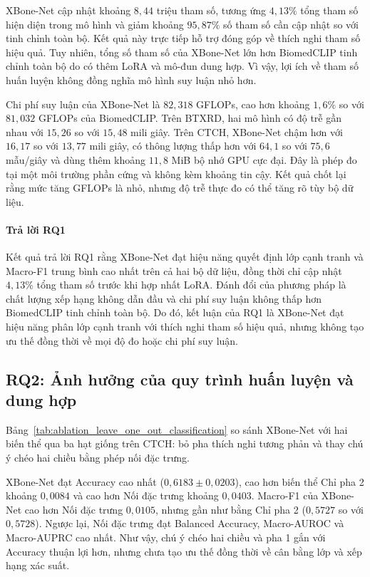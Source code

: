 

XBone-Net cập nhật khoảng $8{,}44$ triệu tham số, tương ứng $4{,}13\%$ tổng tham số hiện diện trong mô hình và giảm khoảng $95{,}87\%$ số tham số cần cập nhật so với tinh chỉnh toàn bộ. Kết quả này trực tiếp hỗ trợ đóng góp về thích nghi tham số hiệu quả. Tuy nhiên, tổng số tham số của XBone-Net lớn hơn BiomedCLIP tinh chỉnh toàn bộ do có thêm LoRA và mô-đun dung hợp. Vì vậy, lợi ích về tham số huấn luyện không đồng nghĩa mô hình suy luận nhỏ hơn.

Chi phí suy luận của XBone-Net là $82{,}318$ GFLOPs, cao hơn khoảng $1{,}6\%$ so với $81{,}032$ GFLOPs của BiomedCLIP. Trên BTXRD, hai mô hình có độ trễ gần nhau với $15{,}26$ so với $15{,}48$ mili giây. Trên CTCH, XBone-Net chậm hơn với $16{,}17$ so với $13{,}77$ mili giây, có thông lượng thấp hơn với $64{,}1$ so với $75{,}6$ mẫu/giây và dùng thêm khoảng $11{,}8$ MiB bộ nhớ GPU cực đại. Đây là phép đo tại một môi trường phần cứng và không kèm khoảng tin cậy. Kết quả chốt lại rằng mức tăng GFLOPs là nhỏ, nhưng độ trễ thực đo có thể tăng rõ tùy bộ dữ liệu.

\paragraph{Trả lời RQ1}
Kết quả trả lời RQ1 rằng XBone-Net đạt hiệu năng quyết định lớp cạnh tranh và Macro-F1 trung bình cao nhất trên cả hai bộ dữ liệu, đồng thời chỉ cập nhật $4{,}13\%$ tổng tham số trước khi hợp nhất LoRA. Đánh đổi của phương pháp là chất lượng xếp hạng không dẫn đầu và chi phí suy luận không thấp hơn BiomedCLIP tinh chỉnh toàn bộ. Do đó, kết luận của RQ1 là XBone-Net đạt hiệu năng phân lớp cạnh tranh với thích nghi tham số hiệu quả, nhưng không tạo ưu thế đồng thời về mọi độ đo hoặc chi phí suy luận.

\subsection{RQ2: Ảnh hưởng của quy trình huấn luyện và dung hợp}
\label{sec:component_evaluation_results}

Bảng~\ref{tab:ablation_leave_one_out_classification} so sánh XBone-Net với hai biến thể qua ba hạt giống trên CTCH: bỏ pha thích nghi tương phản và thay chú ý chéo hai chiều bằng phép nối đặc trưng.



XBone-Net đạt Accuracy cao nhất ($0{,}6183\pm0{,}0203$), cao hơn biến thể Chỉ pha 2 khoảng $0{,}0084$ và cao hơn Nối đặc trưng khoảng $0{,}0403$. Macro-F1 của XBone-Net cao hơn Nối đặc trưng $0{,}0105$, nhưng gần như bằng Chỉ pha 2 ($0{,}5727$ so với $0{,}5728$). Ngược lại, Nối đặc trưng đạt Balanced Accuracy, Macro-AUROC và Macro-AUPRC cao nhất. Như vậy, chú ý chéo hai chiều và pha 1 gắn với Accuracy thuận lợi hơn, nhưng chưa tạo ưu thế đồng thời về cân bằng lớp và xếp hạng xác suất.

